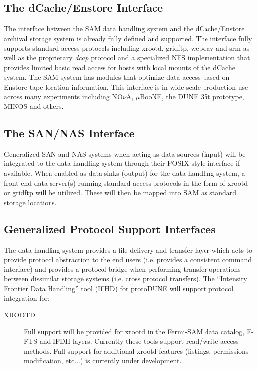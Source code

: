 \documentclass[12pt]{article}
\newcommand{\pd}{protoDUNE\xspace}
\begin{document}
{\subsection{The dCache/Enstore Interface}
The interface between the SAM data handling system and the dCache/Enstore archival storage system is already fully defined and supported.
 The interface fully supports standard access protocols including xrootd, gridftp, webdav and srm as well as the proprietary \textit{dcap} protocol
and a specialized NFS implementation that provides limited basic read access for hosts with local mounts of the dCache system.
The SAM system has modules that optimize data access based on Enstore tape location information.  This interface is in wide scale
production use across many experiments including NO$\nu$A, $\mu$BooNE, the DUNE 35t prototype, MINOS and others.

\subsection{The SAN/NAS Interface}
Generalized SAN and NAS systems when acting as data sources (input) will be integrated to the data handling system through their
POSIX style interface if available.  When enabled as data sinks (output) for the data handling system, a front end data server(s)
running standard access protocols in the form of xrootd or gridftp will be utilized.  These will then be mapped into SAM as standard storage locations.
  
\subsection{Generalized Protocol Support Interfaces}
The data handling system provides a file delivery and transfer layer which acts to provide protocol abstraction
to the end users (i.e. provides a consistent command interface) and provides a protocol bridge when performing
transfer operations between dissimilar storage systems (i.e. cross protocol transfers).  The ``Intensity Frontier
Data Handling'' tool (IFHD) for \pd will support protocol integration for:
\begin{description}
\item[XROOTD] Full support will be provided for xrootd in the Fermi-SAM data catalog, F-FTS and IFDH layers.
Currently these tools support read/write access methods.  Full support for additional xrootd features (listings,
permissions modification, etc...) is currently under development.


\end{description}}
\end{document}
